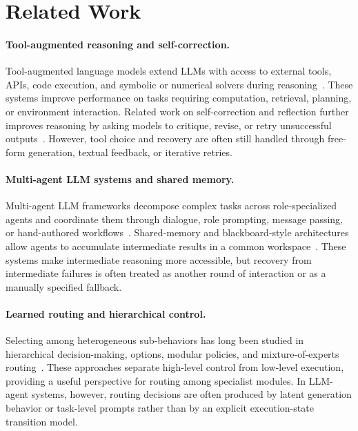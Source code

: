 \section{Related Work}
\label{sec:related}

\paragraph{Tool-augmented reasoning and self-correction.}
Tool-augmented language models extend LLMs with access to external tools, APIs, code execution, and symbolic or numerical solvers during reasoning~\citep{schick2023toolformer,yao2022react,lu2023chameleon,qiao2023taskweaver,ferrag2025llm}.
These systems improve performance on tasks requiring computation, retrieval, planning, or environment interaction.
Related work on self-correction and reflection further improves reasoning by asking models to critique, revise, or retry unsuccessful outputs~\citep{renze2024self,madaan2023self,shinn2023reflexion}.
However, tool choice and recovery are often still handled through free-form generation, textual feedback, or iterative retries.

\paragraph{Multi-agent LLM systems and shared memory.}
Multi-agent LLM frameworks decompose complex tasks across role-specialized agents and coordinate them through dialogue, role prompting, message passing, or hand-authored workflows~\citep{wu2024autogen,hong2023metagpt,shen2025exploring,tran2025multi}.
Shared-memory and blackboard-style architectures allow agents to accumulate intermediate results in a common workspace~\citep{han2025exploring,salemi2025llm}.
These systems make intermediate reasoning more accessible, but recovery from intermediate failures is often treated as another round of interaction or as a manually specified fallback.

\paragraph{Learned routing and hierarchical control.}
Selecting among heterogeneous sub-behaviors has long been studied in hierarchical decision-making, options, modular policies, and mixture-of-experts routing~\citep{stolle2002learning,shazeer2017outrageously,habib2025llm,mei2025omnirouter,Yang2025RELOOP}.
These approaches separate high-level control from low-level execution, providing a useful perspective for routing among specialist modules.
In LLM-agent systems, however, routing decisions are often produced by latent generation behavior or task-level prompts rather than by an explicit execution-state transition model.

